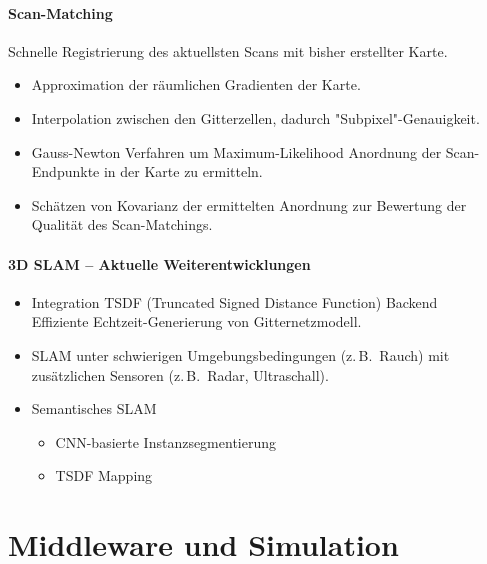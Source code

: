\documentclass[a4paper, 11pt, accentcolor = tud3b]{tudreport}
\newcommand{\zB}{z.\,B.~}
\begin{document}
				\subsubsection{Scan-Matching}
					Schnelle Registrierung des aktuellsten Scans mit bisher erstellter Karte.
					\begin{itemize}
						\item Approximation der räumlichen Gradienten der Karte.
						\item Interpolation zwischen den Gitterzellen, dadurch "Subpixel"-Genauigkeit.
						\item Gauss-Newton Verfahren um Maximum-Likelihood Anordnung der Scan-Endpunkte in der Karte zu ermitteln.
						\item Schätzen von Kovarianz der ermittelten Anordnung zur Bewertung der Qualität des Scan-Matchings.
					\end{itemize}

				\subsubsection{3D SLAM -- Aktuelle Weiterentwicklungen}
					\begin{itemize}
						\item Integration TSDF (Truncated Signed Distance Function) Backend \\ Effiziente Echtzeit-Generierung von Gitternetzmodell.
						\item SLAM unter schwierigen Umgebungsbedingungen (\zB Rauch) mit zusätzlichen Sensoren (\zB Radar, Ultraschall).
						\item Semantisches SLAM
							\begin{itemize}
								\item CNN-basierte Instanzsegmentierung
								\item TSDF Mapping
							\end{itemize}
					\end{itemize}

	\chapter{Middleware und Simulation}
\end{document}
